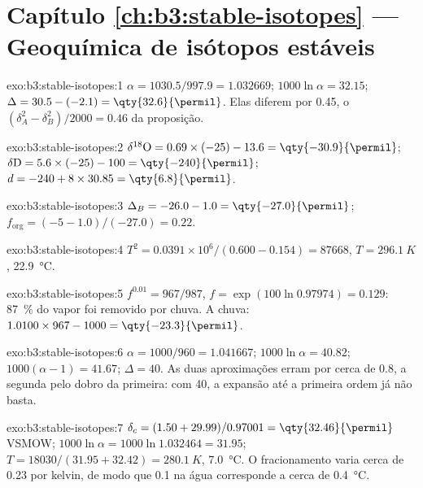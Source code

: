 \section*{Capítulo \ref{ch:b3:stable-isotopes} --- Geoquímica de isótopos estáveis}

\begin{solution}{exo:b3:stable-isotopes:1}
$\alpha = 1030.5/997.9 = 1.032669$; $1000\ln\alpha = 32.15$; $\Delta = 30.5 -
(-2.1) = \qty{32.6}{\permil}$. Elas diferem por \qty{0.45}{\permil}, o
$(\delta_A^2 - \delta_B^2)/2000 = 0.46$ da proposição.
\end{solution}

\begin{solution}{exo:b3:stable-isotopes:2}
$\delta^{18}\mathrm O = 0.69\times(-25) - 13.6 = \qty{-30.9}{\permil}$;
$\delta\mathrm D = 5.6\times(-25) - 100 = \qty{-240}{\permil}$; $d = -240 +
8\times30.85 = \qty{6.8}{\permil}$.
\end{solution}

\begin{solution}{exo:b3:stable-isotopes:3}
$\Delta_B = -26.0 - 1.0 = \qty{-27.0}{\permil}$; $f_{\mathrm{org}} = (-5 -
1.0)/(-27.0) = 0.22$.
\end{solution}

\begin{solution}{exo:b3:stable-isotopes:4}
$T^2 = 0.0391\times10^6/(0.600 - 0.154) = \num{87668}$, $T = \qty{296.1}{K}$,
\qty{22.9}{\celsius}.
\end{solution}

\begin{solution}{exo:b3:stable-isotopes:5}
$f^{0.01} = 967/987$, $f = \exp(100\ln0.97974) = 0.129$: \qty{87}{\percent} do
vapor foi removido por chuva. A chuva: $1.0100\times967 - 1000 =
\qty{-23.3}{\permil}$.
\end{solution}

\begin{solution}{exo:b3:stable-isotopes:6}
$\alpha = 1000/960 = 1.041667$; $1000\ln\alpha = 40.82$; $1000(\alpha - 1) =
41.67$; $\Delta = 40$. As duas aproximações erram por cerca de \qty{0.8}{\permil},
a segunda pelo dobro da primeira: com \qty{40}{\permil}, a expansão até a
primeira ordem já não basta.
\end{solution}

\begin{solution}{exo:b3:stable-isotopes:7}
$\delta_c = (1.50 + 29.99)/0.97001 = \qty{32.46}{\permil}$ VSMOW; $1000\ln\alpha
= 1000\ln1.032464 = 31.95$; $T = 18030/(31.95 + 32.42) = \qty{280.1}{K}$,
\qty{7.0}{\celsius}. O fracionamento varia cerca de \qty{0.23}{\permil} por
kelvin, de modo que \qty{0.1}{\permil} na água corresponde a cerca de \qty{0.4}{\celsius}.
\end{solution}

